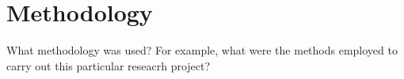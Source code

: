 \section{Methodology}\label{sec:methodology}
What methodology was used? For example, what were the methods
employed to carry out this particular reseacrh project?
